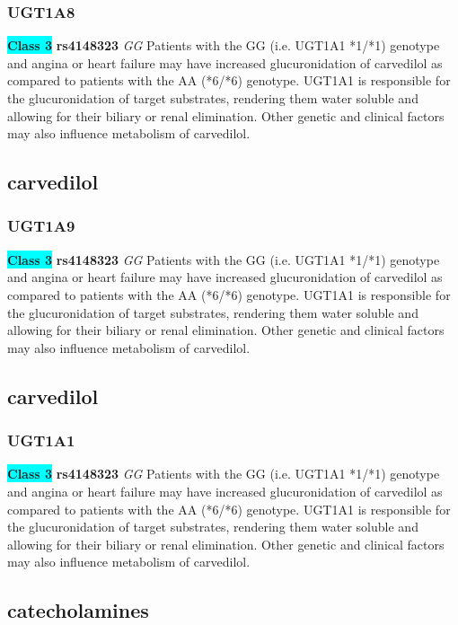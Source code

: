 \documentclass{book}
\begin{document}
\subsubsection{ UGT1A8 }

\begin{center}
\textbf{\colorbox{cyan} {Class 3}} \textbf{ rs4148323 } \textit{ GG }
Patients with the GG (i.e. UGT1A1 *1/*1) genotype and angina or heart failure may have increased glucuronidation of carvedilol as compared to patients with the AA (*6/*6) genotype. UGT1A1 is responsible for the glucuronidation of target substrates, rendering them water soluble and allowing for their biliary or renal elimination. Other genetic and clinical factors may also influence metabolism of carvedilol.


\end{center}\subsection{ carvedilol }


\subsubsection{ UGT1A9 }

\begin{center}
\textbf{\colorbox{cyan} {Class 3}} \textbf{ rs4148323 } \textit{ GG }
Patients with the GG (i.e. UGT1A1 *1/*1) genotype and angina or heart failure may have increased glucuronidation of carvedilol as compared to patients with the AA (*6/*6) genotype. UGT1A1 is responsible for the glucuronidation of target substrates, rendering them water soluble and allowing for their biliary or renal elimination. Other genetic and clinical factors may also influence metabolism of carvedilol.


\end{center}\subsection{ carvedilol }


\subsubsection{ UGT1A1 }

\begin{center}
\textbf{\colorbox{cyan} {Class 3}} \textbf{ rs4148323 } \textit{ GG }
Patients with the GG (i.e. UGT1A1 *1/*1) genotype and angina or heart failure may have increased glucuronidation of carvedilol as compared to patients with the AA (*6/*6) genotype. UGT1A1 is responsible for the glucuronidation of target substrates, rendering them water soluble and allowing for their biliary or renal elimination. Other genetic and clinical factors may also influence metabolism of carvedilol.


\end{center}\subsection{ catecholamines }
\end{document}
